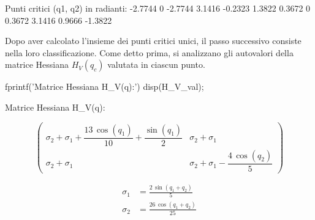 \documentclass[11pt, a4paper]{article}
\begin{document}
\begin{matlaboutput}
Punti critici (q1, q2) in radianti:
   -2.7744         0
   -2.7744    3.1416
   -0.2323    1.3822
    0.3672         0
    0.3672    3.1416
    0.9666   -1.3822
\end{matlaboutput}

\begin{par}
\begin{flushleft}
Dopo aver calcolato l'insieme dei punti critici unici, il passo successivo consiste nella loro classificazione.
Come detto prima, si analizzano gli autovalori della matrice Hessiana $H_V (q_c )$ valutata in ciascun punto.
\end{flushleft}
\end{par}
\newpage
\begin{matlabcode}
fprintf('Matrice Hessiana H_V(q):')
disp(H_V_val);
\end{matlabcode}
\begin{matlaboutput}
Matrice Hessiana H_V(q):
\end{matlaboutput}
\begin{matlabsymbolicoutput}
\[
\begin{pmatrix}
    \sigma_2 +\sigma_1 +\dfrac{13\,\cos \left(q_1 \right)}{10}+\dfrac{\sin \left(q_1 \right)}{2} & \sigma_2 +\sigma_1 \\[8pt]
    \sigma_2 +\sigma_1  & \sigma_2 +\sigma_1 -\dfrac{4\,\cos \left(q_2 \right)}{5}
\end{pmatrix}
\]

\vspace{0.5em}
\noindent{}
\vspace{-0.5em}

\[
\begin{aligned}
    \sigma_1 &= \frac{2\,\sin \left(q_1 +q_2 \right)}{5} \\[4pt]
    \sigma_2 &= \frac{26\,\cos \left(q_1 +q_2 \right)}{25}
\end{aligned}
\]
\end{matlabsymbolicoutput}
\end{document}
